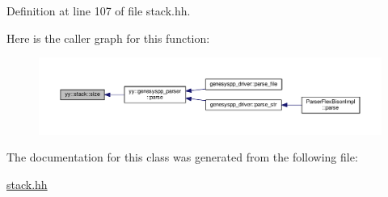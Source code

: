 Definition at line 107 of file stack.\-hh.



Here is the caller graph for this function\-:\nopagebreak
\begin{figure}[H]
\begin{center}
\leavevmode
\includegraphics[width=350pt]{classyy_1_1stack_a5894306917b11057b00e44fbb760839e_icgraph}
\end{center}
\end{figure}




The documentation for this class was generated from the following file\-:\begin{DoxyCompactItemize}
\item 
\hyperlink{stack_8hh}{stack.\-hh}\end{DoxyCompactItemize}
